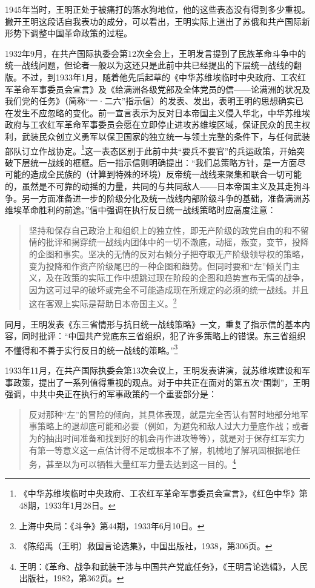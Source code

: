 1945年当时，王明正处于被痛打的落水狗地位，他的这些表态没有得到多少重视。撇开王明这段话自我表功的成分，可以看出，王明实际上道出了苏俄和共产国际新形势下调整中国革命政策的过程。


1932年9月，在共产国际执委会第12次全会上，王明发言提到了民族革命斗争中的统一战线问题，但论者一般以为这还只是此前中共已经提出的下层统一战线的翻版。不过，到1933年1月，随着他先后起草的《中华苏维埃临时中央政府、工农红军革命军事委员会宣言》及《给满洲各级党部及全体党员的信——论满洲的状况及我们党的任务》（简称“一·二六”指示信）的发表、发出，表明王明的思想确实已在发生不应忽略的变化。前一宣言表示为反对日本帝国主义侵入华北，中华苏维埃政府与工农红军革命军事委员会愿在立即停止进攻苏维埃区域，保证民众的民主权利，武装民众创立义勇军以保卫国家的独立统一与领土完整的条件下，与任何武装部队订立作战协定。\footnote{《中华苏维埃临时中央政府、工农红军革命军事委员会宣言》，《红色中华》第48期，1933年1月28日。}这一表态区别于此前中共“要兵不要官”的兵运政策，开始突破下层统一战线的框框。后一指示信则明确提出：“我们总策略方针，是一方面尽可能的造成全民族的（计算到特殊的环境）反帝统一战线来聚集和联合一切可能的，虽然是不可靠的动摇的力量，共同的与共同敌人——日本帝国主义及其走狗斗争。另一方面准备进一步的阶级分化及统一战线内部阶级斗争的基础，准备满洲苏维埃革命胜利的前途。”信中强调在执行反日统一战线策略时应高度注意：

\begin{quote}

坚持和保存自己政治上和组织上的独立性，即无产阶级的政党自由的和不留情的批评和揭穿统一战线内团体中的一切不澈底，动摇，叛变，变节，投降的企图和事实。坚决的无情的反对右倾分子把夺取无产阶级领导权的策略，变为投降和作资产阶级尾巴的一种企图和趋势。但同时要和“左”倾关门主义，及在政策的实际工作中想跳过现在阶段的企图和趋势宣布无情的战争，因为这可过早的破坏或完全不可能造成现在所规定的必须的统一战线。并且这在客观上实际是帮助日本帝国主义。\footnote{上海中央局：《斗争》第44期，1933年6月10日。}
\end{quote}


同月，王明发表《东三省情形与抗日统一战线策略》一文，重复了指示信的基本内容，同时批评：“中国共产党底东三省组织，犯了许多策略上的错误。东三省组织不懂得和不善于实行反日的统一战线的策略。”\footnote{《陈绍禹（王明）救国言论选集》，中国出版社，1938，第306页。}


1933年11月，在共产国际执委会第13次会议上，王明发表讲演，就苏维埃建设和军事政策，提出了一系列值得重视的观点。对于中共正在面对的第五次“围剿”，王明强调，中共中央正在执行的军事政策的一个重要部分是：

\begin{quote}

反对那种“左”的冒险的倾向，其具体表现，就是完全否认有暂时地部分地军事策略上的退却底可能和必要（例如，为避免和敌人过大力量底作战；或者为的抽出时间准备和找到好的机会再作进攻等等），就是对于保存红军实力有第一等意义这一点估计得不足或根本不了解，机械地了解巩固根据地任务，甚至以为可以牺牲大量红军力量去达到这一目的。\footnote{王明：《革命、战争和武装干涉与中国共产党底任务》，《王明言论选辑》，人民出版社，1982，第362页。}
\end{quote}


